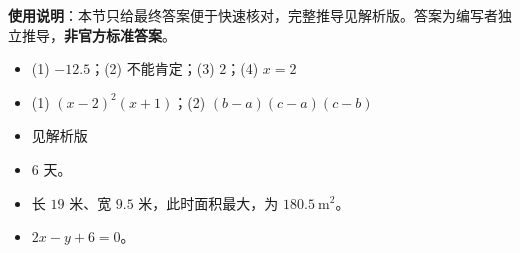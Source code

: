
\begin{gknotice}
\textbf{使用说明}：本节只给最终答案便于快速核对，完整推导见解析版。答案为编写者独立推导，\textbf{非官方标准答案}。
\end{gknotice}

\begin{itemize}[leftmargin=2.6em]
  \item[\textbf{1.}] (1) $-12.5$；(2) 不能肯定；(3) $2$；(4) $x=2$
  \item[\textbf{2.}] (1) $(x-2)^2(x+1)$；(2) $(b-a)(c-a)(c-b)$
  \item[\textbf{3.}] 见解析版
  \item[\textbf{4.}] $6$ 天。
  \item[\textbf{5.}] 长 $19$ 米、宽 $9.5$ 米，此时面积最大，为 $180.5\ \mathrm{m^2}$。
  \item[\textbf{6.}] $2x-y+6=0$。
\end{itemize}
